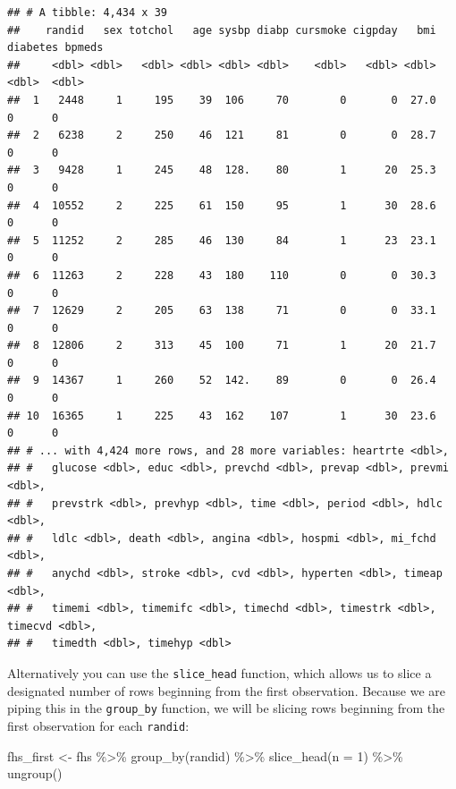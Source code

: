 \documentclass[
]{book}
\newenvironment{Shaded}{\begin{snugshade}}{\end{snugshade}}
\newcommand{\AttributeTok}[1]{\textcolor[rgb]{0.77,0.63,0.00}{#1}}
\newcommand{\DecValTok}[1]{\textcolor[rgb]{0.00,0.00,0.81}{#1}}
\newcommand{\FunctionTok}[1]{\textcolor[rgb]{0.00,0.00,0.00}{#1}}
\newcommand{\NormalTok}[1]{#1}
\newcommand{\OtherTok}[1]{\textcolor[rgb]{0.56,0.35,0.01}{#1}}
\newcommand{\SpecialCharTok}[1]{\textcolor[rgb]{0.00,0.00,0.00}{#1}}
\begin{document}
\begin{verbatim}
## # A tibble: 4,434 x 39
##    randid   sex totchol   age sysbp diabp cursmoke cigpday   bmi diabetes bpmeds
##     <dbl> <dbl>   <dbl> <dbl> <dbl> <dbl>    <dbl>   <dbl> <dbl>    <dbl>  <dbl>
##  1   2448     1     195    39  106     70        0       0  27.0        0      0
##  2   6238     2     250    46  121     81        0       0  28.7        0      0
##  3   9428     1     245    48  128.    80        1      20  25.3        0      0
##  4  10552     2     225    61  150     95        1      30  28.6        0      0
##  5  11252     2     285    46  130     84        1      23  23.1        0      0
##  6  11263     2     228    43  180    110        0       0  30.3        0      0
##  7  12629     2     205    63  138     71        0       0  33.1        0      0
##  8  12806     2     313    45  100     71        1      20  21.7        0      0
##  9  14367     1     260    52  142.    89        0       0  26.4        0      0
## 10  16365     1     225    43  162    107        1      30  23.6        0      0
## # ... with 4,424 more rows, and 28 more variables: heartrte <dbl>,
## #   glucose <dbl>, educ <dbl>, prevchd <dbl>, prevap <dbl>, prevmi <dbl>,
## #   prevstrk <dbl>, prevhyp <dbl>, time <dbl>, period <dbl>, hdlc <dbl>,
## #   ldlc <dbl>, death <dbl>, angina <dbl>, hospmi <dbl>, mi_fchd <dbl>,
## #   anychd <dbl>, stroke <dbl>, cvd <dbl>, hyperten <dbl>, timeap <dbl>,
## #   timemi <dbl>, timemifc <dbl>, timechd <dbl>, timestrk <dbl>, timecvd <dbl>,
## #   timedth <dbl>, timehyp <dbl>
\end{verbatim}

Alternatively you can use the \texttt{slice\_head} function, which allows us to slice a designated number of rows beginning from the first observation. Because we are piping this in the \texttt{group\_by} function, we will be slicing rows beginning from the first observation for each \texttt{randid}:

\begin{Shaded}
\begin{Highlighting}[]
\NormalTok{fhs\_first }\OtherTok{\textless{}{-}}\NormalTok{ fhs }\SpecialCharTok{\%\textgreater{}\%} 
  \FunctionTok{group\_by}\NormalTok{(randid) }\SpecialCharTok{\%\textgreater{}\%} 
  \FunctionTok{slice\_head}\NormalTok{(}\AttributeTok{n =} \DecValTok{1}\NormalTok{) }\SpecialCharTok{\%\textgreater{}\%} 
  \FunctionTok{ungroup}\NormalTok{()}
\end{Highlighting}
\end{Shaded}
\end{document}
